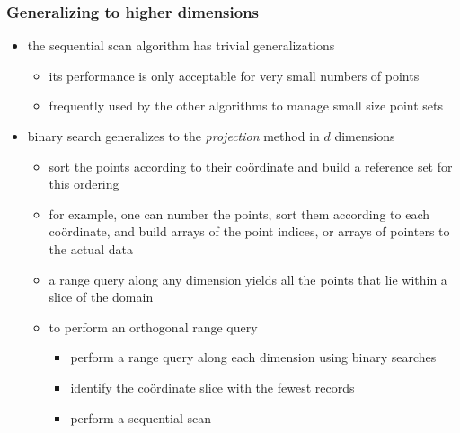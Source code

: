 \begin{frame}[fragile]
%
  \frametitle{Generalizing to higher dimensions}
%
  \begin{itemize}
%
  \item the sequential scan algorithm has trivial generalizations
    \begin{itemize}
    \item its performance is only acceptable for very small numbers of points
    \item frequently used by the other algorithms to manage small size point sets
    \end{itemize}
%
  \item binary search generalizes to the {\em projection} method in $d$ dimensions
    \begin{itemize}
    \item sort the points according to their  co\"ordinate and build a reference set for
      this ordering
    \item for example, one can number the points, sort them according to each co\"ordinate, and
      build arrays of the point indices, or arrays of pointers to the actual data
    \item a range query along any dimension yields all the points that lie within a slice of
      the domain
    \item to perform an orthogonal range query
      \begin{itemize}
      \item perform a range query along each dimension using binary searches
      \item identify the co\"ordinate slice with the fewest records
      \item perform a sequential scan
      \end{itemize}
    \end{itemize}
%
  \end{itemize}
%
\end{frame}

